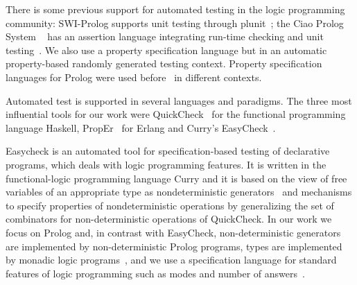 \documentclass[runningheads,a4paper]{../../PaperStyles/llncs}
\newcommand{\todo}[2][?]{\marginpar{\raggedright \tiny TODO: #2}}
\newcommand{\Prolog}[0]{{\sf Prolog}}
\newcommand{\Haskell}[0]{{\sf Haskell}}
\newcommand{\QuickCheck}[0]{{\sf QuickCheck}}
\newcommand{\plqc}[0]{{\sf PrologCheck}}
\begin{document}
%
There is some previous support for automated testing in the logic programming
community:
%
{\sf SWI-Prolog} supports unit testing through {\sf plunit}~\cite{swi-prolog};
%
the {\sf Ciao Prolog System} ~\cite{ciao-prolog} has an assertion language
integrating run-time checking and unit testing~\cite{ciao-assert-unit}.
%
We also use a property specification language but in an
automatic property-based randomly generated testing context.
%
Property specification languages for \Prolog{} were used
before~\cite{ciao-assert-unit,Deville1990logprog,somogyi1995mercury} in
different contexts.


Automated test is supported in several languages and
paradigms.
%
The three most influential tools for our work were \QuickCheck~\cite{quickcheck} for
the functional programming language \Haskell, {\sf PropEr}~\cite{papadakis2011proper} for %
{\sf Erlang}
and {\sf Curry}'s {\sf EasyCheck}~\cite{christiansen2008easycheck}.


{\sf Easycheck} is an automated tool for specification-based testing of
declarative programs, which deals with logic programming features.
%
It is written in the functional-logic programming language Curry and it
is based on the view of free variables of an appropriate type as
nondeterministic generators~\cite{antoy2006overlapping} and mechanisms
to specify  properties of
nondeterministic operations by generalizing the set of combinators for
non-deterministic operations of \QuickCheck{}.
%
In our work we focus on \Prolog{} and, in contrast with {\sf EasyCheck}, non-deterministic generators are implemented by non-deterministic \Prolog{}
programs, types are implemented by monadic logic programs~\cite{fruhwirth1991logic,florido1992types}, and
we use a specification language for standard features of
logic programming such as modes and number of
answers~\cite{Deville1990logprog}.
%
\end{document}
